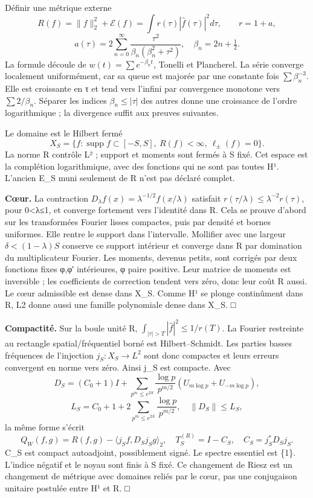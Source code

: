 \documentclass[
  10pt,
  a4paper,
]{article}
\begin{document}
Définir une métrique externe \[
R(f)=\|f\|_2^2+\mathcal E(f)
=\int r(\tau)|\widehat f(\tau)|^2d\tau,\qquad r=1+a,
\] \[
a(\tau)=2\sum_{n=0}^\infty\frac{\tau^2}{\beta_n(\beta_n^2+\tau^2)},
\quad\beta_n=2n+\tfrac12.
\] La formule découle de \(w(t)=\sum e^{-\beta_nt}\), Tonelli et
Plancherel. La série converge localement uniformément, car sa queue est
majorée par une constante fois \(\sum\beta_n^{-3}\). Elle est croissante
en \textbar τ\textbar{} et tend vers l'infini par convergence monotone
vers \(\sum2/\beta_n\). Séparer les indices \(\beta_n\le|\tau|\) des
autres donne une croissance de l'ordre logarithmique ; la divergence
suffit aux preuves suivantes.

Le domaine est le Hilbert fermé \[
X_S=\{f:\operatorname{supp}f\subset[-S,S],\ R(f)<\infty,
\ \ell_\pm(f)=0\}.
\] La norme R contrôle L² ; support et moments sont fermés à S fixé. Cet
espace est la complétion logarithmique, avec des fonctions qui ne sont
pas toutes H¹. L'ancien E\_S muni seulement de R n'est pas déclaré
complet.

\textbf{Cœur.} La contraction
\(D_\lambda f(x)=\lambda^{-1/2}f(x/\lambda)\) satisfait
\(r(\tau/\lambda)\le\lambda^{-2}r(\tau)\), pour 0\textless λ≤1, et
converge fortement vers l'identité dans R. Cela se prouve d'abord sur
les transformées Fourier lisses compactes, puis par densité et bornes
uniformes. Elle rentre le support dans l'intervalle. Mollifier avec une
largeur \(\delta<(1-\lambda)S\) conserve ce support intérieur et
converge dans R par domination du multiplicateur Fourier. Les moments,
devenus petits, sont corrigés par deux fonctions fixes φ,φ′ intérieures,
φ paire positive. Leur matrice de moments est inversible ; les
coefficients de correction tendent vers zéro, donc leur coût R aussi. Le
cœur admissible est dense dans X\_S. Comme H¹ se plonge continûment dans
R, L2 donne aussi une famille polynomiale dense dans X\_S. □

\textbf{Compactité.} Sur la boule unité R,
\(\int_{|\tau|>T}|\widehat f|^2\le1/r(T)\). La Fourier restreinte au
rectangle spatial/fréquentiel borné est Hilbert--Schmidt. Les parties
basses fréquences de l'injection \(j_S:X_S\to L^2\) sont donc compactes
et leurs erreurs convergent en norme vers zéro. Ainsi j\_S est compacte.
Avec \[
D_S=(C_0+1)I+\sum_{p^m\le e^{2S}}\frac{\log p}{p^{m/2}}
(U_{m\log p}+U_{-m\log p}),
\] \[
L_S=C_0+1+2\sum_{p^m\le e^{2S}}\frac{\log p}{p^{m/2}},\quad\|D_S\|\le L_S,
\] la même forme s'écrit \[
Q_W(f,g)=R(f,g)-\langle j_Sf,D_Sj_Sg\rangle_2,
\quad T_S^{(R)}=I-C_S,\quad C_S=j_S^*D_Sj_S.
\] C\_S est compact autoadjoint, possiblement signé. Le spectre
essentiel est \{1\}. L'indice négatif et le noyau sont finis à S fixé.
Ce changement de Riesz est un changement de métrique avec domaines
reliés par le cœur, pas une conjugaison unitaire postulée entre H¹ et R.
□
\end{document}
